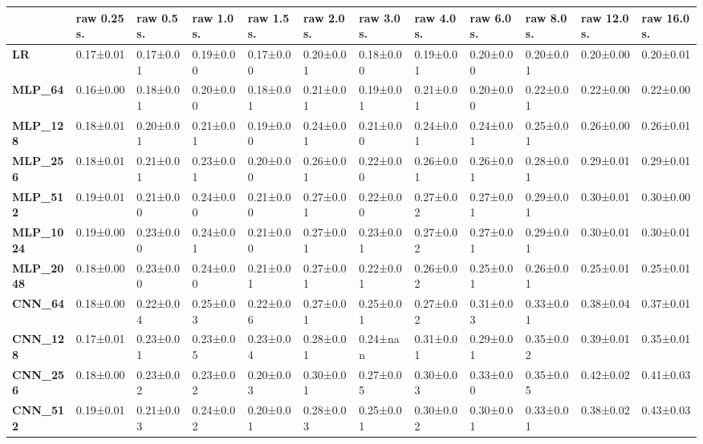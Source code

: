 \begin{tabular}{llllllllllll}
\toprule
{} & raw 0.25 s. & raw 0.5 s. & raw 1.0 s. & raw 1.5 s. & raw 2.0 s. & raw 3.0 s. & raw 4.0 s. & raw 6.0 s. & raw 8.0 s. & raw 12.0 s. & raw 16.0 s. \\
\midrule
\textbf{LR            } &   0.17±0.01 &  0.17±0.01 &  0.19±0.00 &  0.17±0.00 &  0.20±0.01 &  0.18±0.00 &  0.19±0.01 &  0.20±0.00 &  0.20±0.01 &   0.20±0.00 &   0.20±0.01 \\
\textbf{MLP\_64        } &   0.16±0.00 &  0.18±0.01 &  0.20±0.00 &  0.18±0.01 &  0.21±0.01 &  0.19±0.01 &  0.21±0.01 &  0.20±0.00 &  0.22±0.01 &   0.22±0.00 &   0.22±0.00 \\
\textbf{MLP\_128       } &   0.18±0.01 &  0.20±0.01 &  0.21±0.01 &  0.19±0.00 &  0.24±0.01 &  0.21±0.00 &  0.24±0.01 &  0.24±0.01 &  0.25±0.01 &   0.26±0.00 &   0.26±0.01 \\
\textbf{MLP\_256       } &   0.18±0.01 &  0.21±0.01 &  0.23±0.01 &  0.20±0.00 &  0.26±0.01 &  0.22±0.00 &  0.26±0.01 &  0.26±0.01 &  0.28±0.01 &   0.29±0.01 &   0.29±0.01 \\
\textbf{MLP\_512       } &   0.19±0.01 &  0.21±0.00 &  0.24±0.00 &  0.21±0.00 &  0.27±0.01 &  0.22±0.00 &  0.27±0.02 &  0.27±0.01 &  0.29±0.01 &   0.30±0.01 &   0.30±0.00 \\
\textbf{MLP\_1024      } &   0.19±0.00 &  0.23±0.00 &  0.24±0.01 &  0.21±0.00 &  0.27±0.01 &  0.23±0.01 &  0.27±0.02 &  0.27±0.01 &  0.29±0.01 &   0.30±0.01 &   0.30±0.01 \\
\textbf{MLP\_2048      } &   0.18±0.00 &  0.23±0.00 &  0.24±0.00 &  0.21±0.01 &  0.27±0.01 &  0.22±0.01 &  0.26±0.02 &  0.25±0.01 &  0.26±0.01 &   0.25±0.01 &   0.25±0.01 \\
\textbf{CNN\_64        } &   0.18±0.00 &  0.22±0.04 &  0.25±0.03 &  0.22±0.06 &  0.27±0.01 &  0.25±0.01 &  0.27±0.02 &  0.31±0.03 &  0.33±0.01 &   0.38±0.04 &   0.37±0.01 \\
\textbf{CNN\_128       } &   0.17±0.01 &  0.23±0.01 &  0.23±0.05 &  0.23±0.04 &  0.28±0.01 &   0.24±nan &  0.31±0.01 &  0.29±0.01 &  0.35±0.02 &   0.39±0.01 &   0.35±0.01 \\
\textbf{CNN\_256       } &   0.18±0.00 &  0.23±0.02 &  0.23±0.02 &  0.20±0.03 &  0.30±0.01 &  0.27±0.05 &  0.30±0.03 &  0.33±0.00 &  0.35±0.05 &   0.42±0.02 &   0.41±0.03 \\
\textbf{CNN\_512       } &   0.19±0.01 &  0.21±0.03 &  0.24±0.02 &  0.20±0.01 &  0.28±0.03 &  0.25±0.01 &  0.30±0.02 &  0.30±0.01 &  0.33±0.01 &   0.38±0.02 &   0.43±0.03 \\

\end{tabular}
